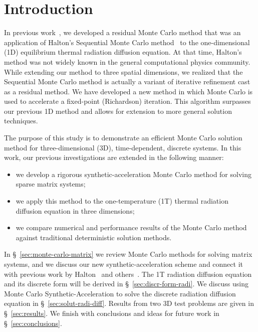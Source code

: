\documentclass[preprint,12pt]{elsarticle}
\begin{document}
\section{Introduction}
\label{sec:introduction}

In previous work~\cite{evans_2003}, we developed a residual Monte Carlo method
that was an application of Halton's Sequential Monte Carlo
method~\cite{halton_1962,halton_1994} to the one-dimensional (1D) equilibrium
thermal radiation diffusion equation.  At that time, Halton's method was not
widely known in the general computational physics community.  While extending
our method to three spatial dimensions, we realized that the Sequential Monte
Carlo method is actually a variant of iterative refinement cast as a residual
method. We have developed a new method in which Monte Carlo is used to
accelerate a fixed-point (Richardson) iteration. This algorithm surpasses our
previous 1D method and allows for extension to more general solution
techniques.

The purpose of this study is to demonstrate an efficient Monte Carlo solution
method for three-dimensional (3D), time-dependent, discrete systems. In this
work, our previous investigations are extended in the following manner:
\begin{itemize}
\item we develop a rigorous synthetic-acceleration Monte Carlo method
  for solving sparse matrix systems;
\item we apply this method to the one-temperature (1T) thermal radiation
  diffusion equation in three dimensions;
\item we compare numerical and performance results of the Monte Carlo
  method against traditional deterministic solution methods.
\end{itemize}

In \S~\ref{sec:monte-carlo-matrix} we review Monte Carlo methods for solving
matrix systems, and we discuss our new synthetic-acceleration scheme and
connect it with previous work by Halton~\cite{halton_1994} and
others~\cite{evans_2003}.  The 1T radiation diffusion equation and its
discrete form will be derived in \S~\ref{sec:discr-form-radi}.  We discuss
using Monte Carlo Synthetic-Acceleration to solve the discrete radiation
diffusion equation in \S~\ref{sec:solut-radi-diff}.  Results from two 3D test
problems are given in \S~\ref{sec:results}.  We finish with conclusions and
ideas for future work in \S~\ref{sec:conclusions}.
\end{document}
